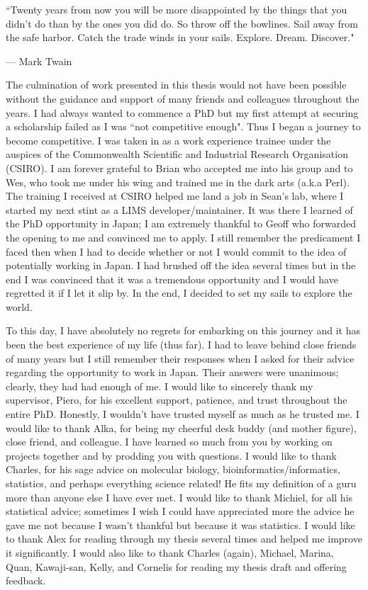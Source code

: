 \epigraph{``Twenty years from now you will be more disappointed by the things that you didn't do than by the ones you did do. So throw off the bowlines. Sail away from the safe harbor. Catch the trade winds in your sails. Explore. Dream. Discover."}{--- \textup{Mark Twain}}

The culmination of work presented in this thesis would not have been possible without the guidance and support of many friends and colleagues throughout the years. I had always wanted to commence a PhD but my first attempt at securing a scholarship failed as I was ``not competitive enough". Thus I began a journey to become competitive. I was taken in as a work experience trainee under the auspices of the Commonwealth Scientific and Industrial Research Organisation (CSIRO). I am forever grateful to Brian who accepted me into his group and to Wes, who took me under his wing and trained me in the dark arts (a.k.a Perl). The training I received at CSIRO helped me land a job in Sean's lab, where I started my next stint as a LIMS developer/maintainer. It was there I learned of the PhD opportunity in Japan; I am extremely thankful to Geoff who forwarded the opening to me and convinced me to apply. I still remember the predicament I faced then when I had to decide whether or not I would commit to the idea of potentially working in Japan. I had brushed off the idea several times but in the end I was convinced that it was a tremendous opportunity and I would have regretted it if I let it slip by. In the end, I decided to set my sails to explore the world.

To this day, I have absolutely no regrets for embarking on this journey and it has been the best experience of my life (thus far). I had to leave behind close friends of many years but I still remember their responses when I asked for their advice regarding the opportunity to work in Japan. Their answers were unanimous; clearly, they had had enough of me. I would like to sincerely thank my supervisor, Piero, for his excellent support, patience, and trust throughout the entire PhD. Honestly, I wouldn't have trusted myself as much as he trusted me. I would like to thank Alka, for being my cheerful desk buddy (and mother figure), close friend, and colleague. I have learned so much from you by working on projects together and by prodding you with questions. I would like to thank Charles, for his sage advice on molecular biology, bioinformatics/informatics, statistics, and perhaps everything science related! He fits my definition of a guru more than anyone else I have ever met. I would like to thank Michiel, for all his statistical advice; sometimes I wish I could have appreciated more the advice he gave me not because I wasn't thankful but because it was statistics. I would like to thank Alex for reading through my thesis several times and helped me improve it significantly. I would also like to thank Charles (again), Michael, Marina, Quan, Kawaji-san, Kelly, and Cornelis for reading my thesis draft and offering feedback.

